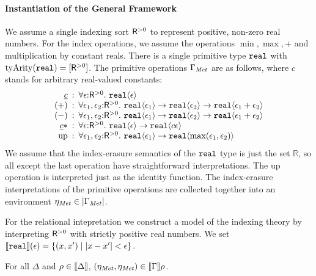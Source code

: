 \paragraph{Instantiation of the General Framework}
We assume a single indexing sort $\mathsf{R}^{>0}$ %
to represent positive, non-zero real numbers. For the index
operations, we assume the operations $\min, \max, +$ and
multiplication by constant reals. There is a single primitive type
$\textup{\texttt{real}}$ with $\mathrm{tyArity}(\textup{\texttt{real}}) =
[\mathsf{R}^{>0}]$. The primitive operations $\Gamma_{\mathit{Met}}$ are as
follows, where $c$ stands for arbitrary real-valued constants:
\begin{displaymath}
  \begin{array}{r@{\hspace{0.5em}:\hspace{0.5em}}l}
    \underline{c} & \forall \epsilon\mathord:\metricSort.\ \tyPrim{real}{\epsilon} \\
    (+) & \forall \epsilon_1, \epsilon_2\mathord:\metricSort.\ \tyPrim{real}{\epsilon_1} \to \tyPrim{real}{\epsilon_2} \to \tyPrim{real}{\epsilon_1 + \epsilon_2} \\
    (-) & \forall \epsilon_1, \epsilon_2\mathord:\metricSort.\ \tyPrim{real}{\epsilon_1} \to \tyPrim{real}{\epsilon_2} \to \tyPrim{real}{\epsilon_1 + \epsilon_2} \\
    \underline{c} * & \forall \epsilon\mathord:\metricSort.\ \tyPrim{real}{\epsilon} \to \tyPrim{real}{c\epsilon} \\
    \mathrm{up} & \forall \epsilon_1,\epsilon_2\mathord:\metricSort.\ \tyPrim{real}{\epsilon_1} \to \tyPrim{real}{\max(\epsilon_1,\epsilon_2)}
  \end{array}
\end{displaymath}
We assume that the index-erasure semantics of the $\textup{\texttt{real}}$
type is just the set $\mathbb{R}$, so all except the last operation
have straightforward interpretations. The $\mathrm{up}$ operation is
interpreted just as the identity function. The index-erasure
interpretations of the primitive operations are collected together
into an environment $\eta_{\mathit{Met}} \in \left| \Gamma_{\mathit{Met}}\right|$.

For the relational intepretation we construct a model of the indexing
theory by interpreting $\mathsf{R}^{>0}$ with strictly positive real
numbers. We set $\llbracket \textup{\texttt{real}} \rrbracket(\epsilon) = \{ (x,x') \mathrel|
\lvert x - x' \rvert < \epsilon \}$.
\begin{lemma}\label{lem:metric-environments}
  For all $\Delta$ and $\rho \in \llbracket \Delta \rrbracket$, $(\eta_{\mathit{Met}},
  \eta_{\mathit{Met}}) \in \llbracket \Gamma \rrbracket{\rho}$.
\end{lemma}

